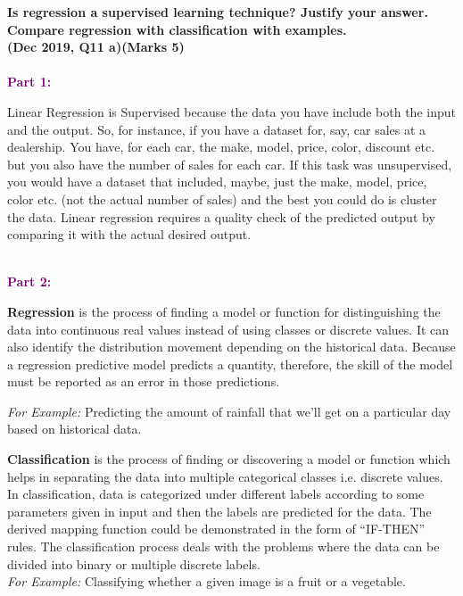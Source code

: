 
\textbf{\textcolor{LightMagenta}{Is regression a supervised learning technique? Justify your answer. Compare regression with classification with examples.\\ (Dec 2019, Q11 a)\hfill (Marks 5)}} \\[5pt]
\\
\textbf{\textcolor{purple}{Part 1:} }

   Linear Regression is Supervised because the data you have include both the input and the output. So, for instance, if you have a dataset for, say, car sales at a dealership. You have, for each car, the make, model, price, color, discount etc. but you also have the number of sales for each car. If this task was unsupervised, you would have a dataset that included, maybe, just the make, model, price, color etc. (not the actual number of sales) and the best you could do is cluster the data. Linear regression requires a quality check of the predicted output by comparing it with the actual desired output.

    

    \newline \\
\textbf{\textcolor{purple}{Part 2:} }
    
   \textbf{\textcolor{ReddishRose}{Regression} } is the process of finding a model or function for distinguishing the data into continuous real values instead of using classes or discrete values. It can also identify the distribution movement depending on the historical data. Because a regression predictive model predicts a quantity, therefore, the skill of the model must be reported as an error in those predictions.

    
    \textit{For Example:}  Predicting the amount of rainfall that we’ll get on a particular day based on historical data.
    
    \textbf{\textcolor{ReddishRose}{Classification}} is the process of finding or discovering a model or function which helps in separating the data into multiple categorical classes i.e. discrete values. In classification, data is categorized under different labels according to some parameters given in input and then the labels are predicted for the data. The derived mapping function could be demonstrated in the form of “IF-THEN” rules. The classification process deals with the problems where the data can be divided into binary or multiple discrete labels. \newline \\
 \textit{For Example:} Classifying whether a given image is a fruit or a vegetable.

